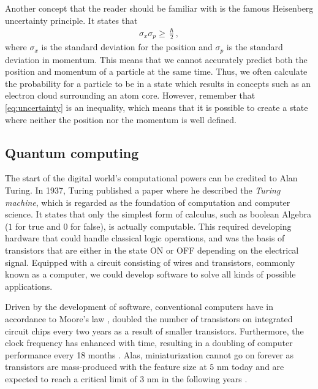 
Another concept that the reader should be familiar with is the famous Heisenberg uncertainty principle. It states that
\begin{align}
    \sigma_x \sigma_p \geq \frac{\hslash}{2},
    \label{eq:uncertainty}
\end{align}
where $\sigma_x$ is the standard deviation for the position and $\sigma_p$ is the standard deviation in momentum. This means that we cannot accurately predict both the position and momentum of a particle at the same time. Thus, we often calculate the probability for a particle to be in a state which results in concepts such as an electron cloud surrounding an atom core. However, remember that \autoref{eq:uncertainty} is an inequality, which means that it is possible to create a state where neither the position nor the momentum is well defined.

\subsection{Quantum computing}
The start of the digital world's computational powers can be credited to Alan Turing. In 1937, Turing \cite{Turing1937} published a paper where he described the \textit{Turing machine}, which is regarded as the foundation of computation and computer science. It states that only the simplest form of calculus, such as boolean Algebra ($1$ for true and $0$ for false), is actually computable. This required developing hardware that could handle classical logic operations, and was the basis of transistors that are either in the state ON or OFF depending on the electrical signal. Equipped with a circuit consisting of wires and transistors, commonly known as a computer, we could develop software to solve all kinds of possible applications.

Driven by the development of software, conventional computers have in accordance to Moore's law \cite{Moore1965}, doubled the number of transistors on integrated circuit chips every two years as a result of smaller transistors. Furthermore, the clock frequency has enhanced with time, resulting in a doubling of computer performance every 18 months \cite{Pavicic2006}. Alas, miniaturization cannot go on forever as transistors are mass-produced with the feature size at $5$ nm today and are expected to reach a critical limit of $3$ nm in the following years \cite{Gwennap2020}.


